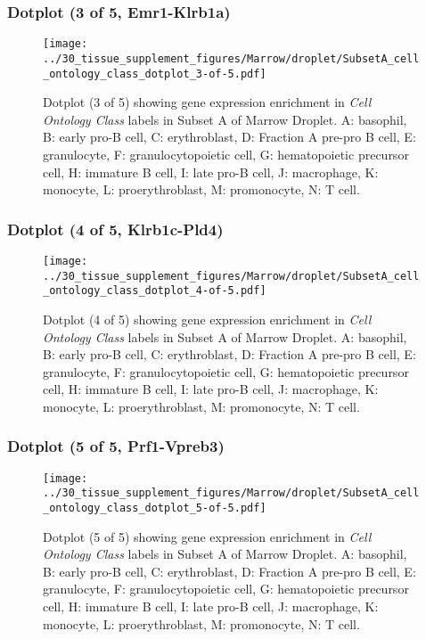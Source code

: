 \clearpage

\subsubsection{Dotplot (3 of 5, Emr1-Klrb1a)}
\begin{figure}[h]
\centering
\texttt{[image: ../30\_tissue\_supplement\_figures/Marrow/droplet/SubsetA\_cell\_ontology\_class\_dotplot\_3-of-5.pdf]}

\caption{ Dotplot (3 of 5)  showing gene expression enrichment in \emph{Cell Ontology Class} labels in Subset A of Marrow Droplet. A: basophil, B: early pro-B cell, C: erythroblast, D: Fraction A pre-pro B cell, E: granulocyte, F: granulocytopoietic cell, G: hematopoietic precursor cell, H: immature B cell, I: late pro-B cell, J: macrophage, K: monocyte, L: proerythroblast, M: promonocyte, N: T cell.}
\end{figure}


\clearpage

\subsubsection{Dotplot (4 of 5, Klrb1c-Pld4)}
\begin{figure}[h]
\centering
\texttt{[image: ../30\_tissue\_supplement\_figures/Marrow/droplet/SubsetA\_cell\_ontology\_class\_dotplot\_4-of-5.pdf]}

\caption{ Dotplot (4 of 5)  showing gene expression enrichment in \emph{Cell Ontology Class} labels in Subset A of Marrow Droplet. A: basophil, B: early pro-B cell, C: erythroblast, D: Fraction A pre-pro B cell, E: granulocyte, F: granulocytopoietic cell, G: hematopoietic precursor cell, H: immature B cell, I: late pro-B cell, J: macrophage, K: monocyte, L: proerythroblast, M: promonocyte, N: T cell.}
\end{figure}


\clearpage

\subsubsection{Dotplot (5 of 5, Prf1-Vpreb3)}
\begin{figure}[h]
\centering
\texttt{[image: ../30\_tissue\_supplement\_figures/Marrow/droplet/SubsetA\_cell\_ontology\_class\_dotplot\_5-of-5.pdf]}

\caption{ Dotplot (5 of 5)  showing gene expression enrichment in \emph{Cell Ontology Class} labels in Subset A of Marrow Droplet. A: basophil, B: early pro-B cell, C: erythroblast, D: Fraction A pre-pro B cell, E: granulocyte, F: granulocytopoietic cell, G: hematopoietic precursor cell, H: immature B cell, I: late pro-B cell, J: macrophage, K: monocyte, L: proerythroblast, M: promonocyte, N: T cell.}
\end{figure}


